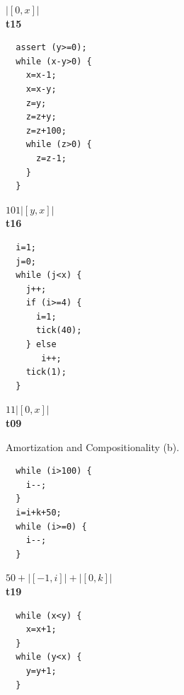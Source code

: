 \documentclass[nocopyrightspace,preprint,pldi]{sigplanconf-pldi15}
\begin{document}
{\begin{figure}
\begin{minipage}[b]{\progwidth}
\begin{center}
$|[0,x]|$
\\[.7\baselineskip]
      {\bf t15}
    \end{center}
  \end{minipage}
%
%
  \begin{minipage}[b]{\progwidth}
    \begin{center}
   \begin{lstlisting}
  assert (y>=0);
  while (x-y>0) {
    x=x-1;
    x=x-y;
    z=y;
    z=z+y;
    z=z+100;
    while (z>0) {
      z=z-1;
    }
  }
   \end{lstlisting}

$101|[y,x]|$
\\[.7\baselineskip]
      {\bf t16}
    \end{center}
  \end{minipage}
%
%
  \begin{minipage}[b]{\progwidth}
    \begin{center}
   \begin{lstlisting}
  i=1;
  j=0;
  while (j<x) {
    j++;
    if (i>=4) {
      i=1;
      tick(40);
    } else
       i++;
    tick(1);
  }
   \end{lstlisting}

$11|[0,x]|$
\\[.7\baselineskip]
      {\bf t09}
    \end{center}
  \end{minipage}


   \caption{Amortization and Compositionality (b).}
  \label{fig:cat1b}
\end{figure}


\begin{figure}
 \setlength{\progwidth}{.24\linewidth}
  \centering

  \begin{minipage}[b]{\progwidth}
    \begin{center}
   \begin{lstlisting}
  while (i>100) {
    i--;
  }
  i=i+k+50;
  while (i>=0) {
    i--;
  }
   \end{lstlisting}

$50 + |[-1,i]| + |[0,k]|$
\\[.7\baselineskip]
      {\bf t19}
    \end{center}
  \end{minipage}%
%
%
%
  \begin{minipage}[b]{\progwidth}
    \begin{center}
   \begin{lstlisting}
  while (x<y) {
    x=x+1;
  }
  while (y<x) {
    y=y+1;
  }
   \end{lstlisting}


\end{center}
\end{minipage}
\end{figure}}
\end{document}
